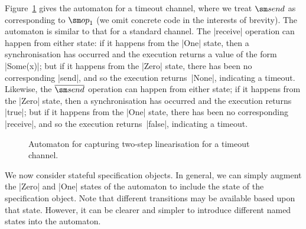 Figure~\ref{fig:two-step-timeout-chan} gives the automaton for a timeout
channel, where we treat $\send$ as corresponding to $\op_1$ (we omit concrete
code in the interests of brevity).  The automaton is similar to that for a
standard channel.  The |receive| operation can happen from either state: if it
happens from the |One| state, then a synchronisation has occurred and the
execution returns a value of the form |Some(x)|; but if it happens from the
|Zero| state, there has been no corresponding |send|, and so the execution
returns~|None|, indicating a timeout.  Likewise, the $\overline{\send}$
operation can happen from either state; if it happens from the |Zero| state,
then a synchronisation has occurred and the execution returns |true|; but if
it happens from the |One| state, there has been no corresponding |receive|,
and so the execution returns~|false|, indicating a timeout.

\begin{figure}
\begin{center}
\end{center}
\caption{Automaton for capturing two-step linearisation for a timeout
  channel.}
\label{fig:two-step-timeout-chan}
\end{figure}




We now consider stateful specification objects.  In general, we can simply
augment the |Zero| and |One| states of the automaton to include the state of
the specification object.  Note that different transitions may be available
based upon that state.  However, it can be clearer and simpler to introduce
different named states into the automaton.

